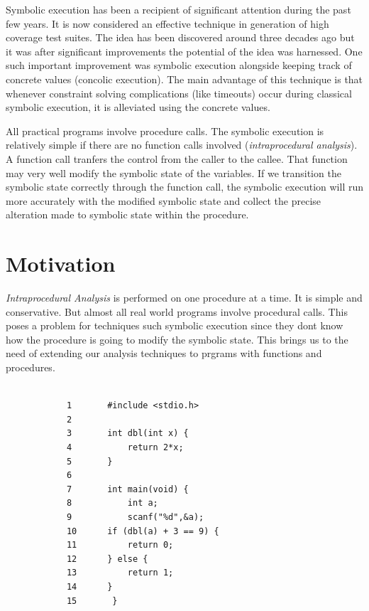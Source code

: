 \documentclass[12pt,oneside]{book}
\begin{document}
\hspace {0.4 cm}
Symbolic execution has been a recipient of significant attention during the past few years. It is now considered an effective technique in generation of high coverage test suites. The idea has been discovered around three decades ago but it was after significant improvements the potential of the idea was harnessed. One such important improvement was symbolic execution alongside keeping track of concrete values (concolic execution). The main advantage of this technique is that whenever constraint solving complications (like timeouts) occur during classical symbolic execution, it is alleviated using the concrete values.

All practical programs involve procedure calls. The symbolic execution is relatively simple if there are no function calls involved (\textit{intraprocedural analysis}). A function call tranfers the control from the caller to the callee. That function may very well modify the symbolic state of the variables. If we transition the symbolic state correctly through the function call, the symbolic execution will run more accurately with the modified symbolic state and collect the precise alteration made to symbolic state within the procedure.    


\section{Motivation}
\textit{Intraprocedural Analysis} is performed on one procedure at a time. It is simple and conservative. But almost all real world programs involve procedural calls. This poses a problem for techniques such symbolic execution since they dont know how the procedure is going to modify the symbolic state. This brings us to the need of extending our analysis techniques to prgrams with functions and procedures.\\

\begin{lstlisting}[caption=Motivational example]

			1		#include <stdio.h>
			2
			3		int dbl(int x) {
			4 			return 2*x;
			5		}
			6
			7		int main(void) {
			8 			int a;
			9			scanf("%d",&a);
			10 		if (dbl(a) + 3 == 9) {
			11	   		return 0;
			12 		} else {
			13	   		return 1;
			14 		}
			15		 }

\end{lstlisting}
\end{document}
